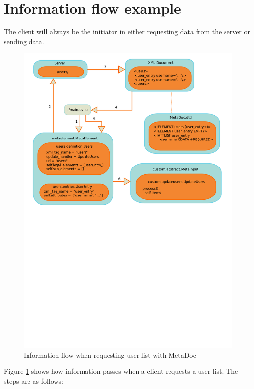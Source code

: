 \newpage
\section{Information flow example}
\label{sec:information_flow}

The client will always be the initiator in either requesting data from the
server or sending data. 

\begin{figure}[h!]
    \includegraphics[width=\textwidth]{img/xml_flow}
    \caption{Information flow when requesting user list with MetaDoc}
    \label{fig:information_flow}
\end{figure}

Figure \ref{fig:information_flow} shows how information passes when a client
requests a user list. The steps are as follows:

